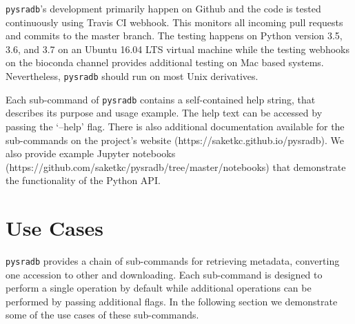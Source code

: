 \documentclass[9pt,a4paper]{extarticle}
\begin{document}
\texttt{pysradb}'s development primarily happen on Github
and the code is tested continuously using Travis CI webhook. This monitors
all incoming pull requests and commits to the master branch. The testing
happens on Python version 3.5, 3.6, and 3.7 on an Ubuntu 16.04 LTS virtual
machine while the testing webhooks on the bioconda channel provides
additional testing on Mac based systems. Nevertheless, \texttt{pysradb} should
run on most Unix derivatives.

Each sub-command of \texttt{pysradb} contains a self-contained help string,
that describes its purpose and usage example. The help text can be accessed
by passing the `--help' flag. There is also additional documentation available
for the sub-commands on the project's website (https://saketkc.github.io/pysradb).
We also provide example Jupyter \cite{Kluyver:2016aa} notebooks (https://github.com/saketkc/pysradb/tree/master/notebooks)
that demonstrate the functionality of the Python API. 






\section*{Use Cases} %
\texttt{pysradb} provides a chain of sub-commands for retrieving metadata, converting
one accession to other and downloading. Each sub-command is designed to perform
a single operation by default while additional operations can be performed by passing 
additional flags. In the following section we demonstrate some of the use cases
of these sub-commands.
\end{document}
